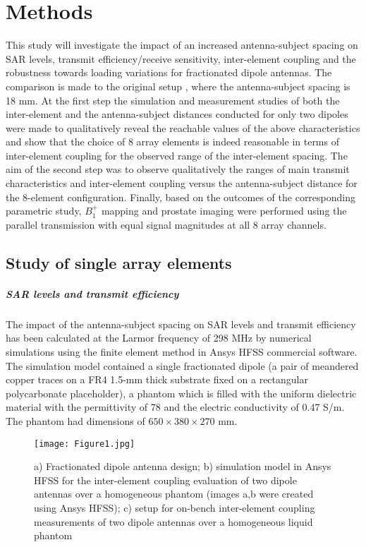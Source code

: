 \documentclass[fleqn,10pt]{wlscirep}
\begin{document}
\section*{Methods}

This study will investigate the impact of an increased antenna-subject spacing on SAR levels, transmit efficiency/receive sensitivity, inter-element coupling and the robustness towards loading variations for fractionated dipole antennas. The comparison is made to the original setup \cite{Fractionated}, where the antenna-subject spacing is 18 mm. At the first step the simulation and measurement studies of both the inter-element and the antenna-subject distances conducted for only two dipoles were made to qualitatively reveal the reachable values of the above characteristics and show that the choice of 8 array elements is indeed reasonable in terms of inter-element coupling for the observed range of the inter-element spacing. The aim of the second step was to observe qualitatively the ranges of main transmit characteristics and inter-element coupling versus the antenna-subject distance for the 8-element configuration. Finally, based on the outcomes of the corresponding parametric study, $B_1^{+}$ mapping and prostate imaging were performed using the parallel transmission with equal signal magnitudes at all 8 array channels. 

\subsection*{Study of single array elements}

\subparagraph*{SAR levels and transmit efficiency}

The impact of the antenna-subject spacing on SAR levels and transmit efficiency has been calculated at the Larmor frequency of 298 MHz by numerical simulations using the finite element method in Ansys HFSS commercial software. The simulation model contained a single fractionated dipole (a pair of meandered copper traces on a FR4 1.5-mm thick substrate fixed on a rectangular polycarbonate placeholder), a phantom which is filled with the uniform dielectric material with the permittivity of 78 and the electric conductivity of 0.47 S/m. The phantom had dimensions of $650\times380 \times270$ mm.

\begin{figure}[t]
\center
\texttt{[image: Figure1.jpg]}
\caption{ a) Fractionated dipole antenna design; b) simulation model in Ansys HFSS for the inter-element coupling evaluation of two dipole antennas over a homogeneous phantom (images a,b were created using Ansys HFSS); c) setup for on-bench inter-element coupling measurements of two dipole antennas over a homogeneous liquid phantom}
\label{setup}
\end{figure}
\end{document}
